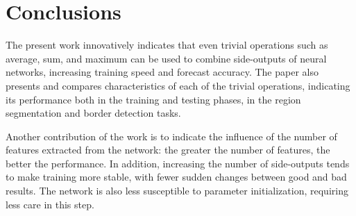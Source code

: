 \section{Conclusions}
\label{cap7_contribuicoes}


The present work innovatively indicates that even trivial operations such as average, sum, and maximum can be used to combine side-outputs of neural networks, increasing training speed and forecast accuracy.
The paper also presents and compares characteristics of each of the trivial operations, indicating its performance both in the training and testing phases, in the region segmentation and border detection tasks.

Another contribution of the work is to indicate the influence of the number of features extracted from the network: the greater the number of features, the better the performance.
In addition, increasing the number of side-outputs tends to make training more stable, with fewer sudden changes between good and bad results.
The network is also less susceptible to parameter initialization, requiring less care in this step.


